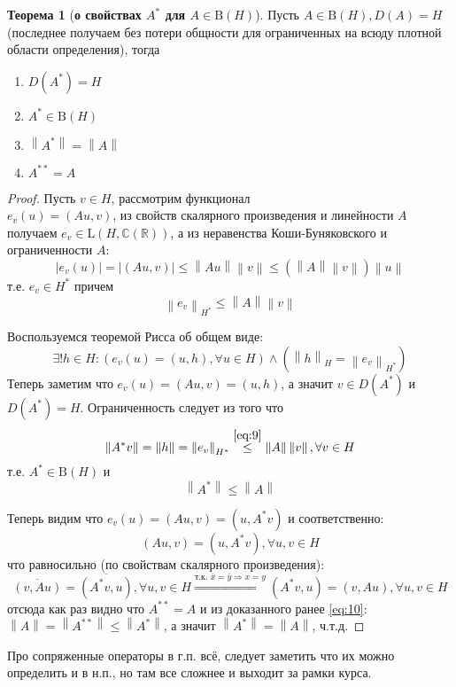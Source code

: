 \documentclass[12pt,a4paper]{article}
\theoremstyle{definition}
\newtheorem{theorem}{Теорема}
\newcommand{\Real}{\mathbb{R}}
\newcommand{\Cmplx}{\mathbb{C}}
\newcommand{\norm}[1]{\left\lVert#1\right\rVert}
\newcommand{\boundedo}[1]{\textrm{B}(#1)}
\newcommand{\linear}[2]{\textrm{L}(#1, #2)}
\begin{document}
\begin{theorem}[\textbf{о свойствах $A^*$ для $A \in \boundedo{H}$}]
	Пусть $A \in \boundedo{H}, D(A) = H$ (последнее получаем без потери общности для ограниченных на всюду плотной области определения), тогда
	\begin{enumerate}
		\item $D(A^*) = H$
		\item $A^* \in \boundedo{H}$
		\item $\norm{A^*} = \norm{A}$
		\item $A^{**} = A$
	\end{enumerate}
\end{theorem}
\begin{proof}
	Пусть $v \in H$, рассмотрим функционал \\ $e_v(u) = (Au, v)$, из свойств скалярного произведения и линейности $A$ получаем $e_v \in \linear{H}{\Cmplx(\Real)}$, а из неравенства Коши-Буняковского и ограниченности $A$:
	$$|e_v (u)| = |(Au, v)| \leq \norm{Au}\norm{v} \leq (\norm{A}\norm{v})\norm{u}$$
	т.е. $e_v \in H^*$ причем 
	\begin{equation}\label{eq:9}
		\norm{e_v}_{H^*} \leq \norm{A}\norm{v}
	\end{equation}
	
	Воспользуемся теоремой Рисса об общем виде: $$\exists!h\in H: \left(e_v(u) = (u, h), \forall u \in H\right) \wedge \left(\norm{h}_H = \norm{e_v}_{H^*}\right) $$
	Теперь заметим что $e_v(u) = (Au, v) = (u, h)$, а значит $v \in D(A^*)$ и $D(A^*) = H$. Ограниченность следует из того что 
	$$\norm{A^* v} = \norm{h} = \norm{e_v}_{H^*} \overset{\eqref{eq:9}}{\leq} \norm{A}\norm{v}, \forall v \in H$$
	т.е. $A^* \in \boundedo{H}$ и
	\begin{equation}\label{eq:10}
		\norm{A^*} \leq \norm{A}
	\end{equation}
	
	Теперь видим что $e_v (u) = (Au, v) = (u, A^* v)$ и соответственно:
	$$(Au, v) = (u, A^* v), \forall u, v \in H$$
	что равносильно (по свойствам скалярного произведения):
	$$\overline{(v, Au)} = \overline{(A^* v, u)}, \forall u, v \in H \overset{\text{т.к. }\bar{x} = \bar{y} \Rightarrow x = y}{\Rightarrow} (A^* v, u) = (v, Au), \forall u, v \in H$$
	отсюда как раз видно что $A^{**} = A$ и из доказанного ранее \eqref{eq:10}: \\ $\norm{A} = \norm{A^{**}} \leq \norm{A^*}$, а значит $\norm{A^*} = \norm{A}$, ч.т.д.
\end{proof}
Про сопряженные операторы в г.п. всё, следует заметить что их можно определить и в н.п., но там все сложнее и выходит за рамки курса.

\newpage
\renewcommand{\listtheoremname}{Список теорем и утверждений}
\listoftheorems[ignoreall, show={theorem,corollary}]
\end{document}
